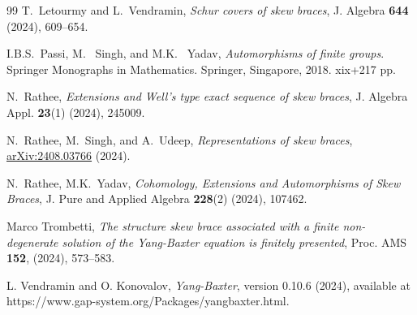 \documentclass[11pt]{amsart}
\theoremstyle{thrm}
\theoremstyle{plain}
\theoremstyle{definition}
\numberwithin{equation}{section}
\begin{document}
\begin{thebibliography}{99}
	 T.~Letourmy and L.~Vendramin, \textit{Schur covers of skew braces}, J. Algebra \textbf{644} (2024), 609--654.
	
	I.B.S.~Passi, M.~ Singh, and M.K.~ Yadav, \textit{Automorphisms of finite groups}. Springer Monographs in Mathematics. Springer, Singapore, 2018. xix+217 pp.
	
	 N.~Rathee, \textit{Extensions and Well's type exact sequence of skew braces}, J. Algebra Appl. \textbf{23}(1) (2024), 245009.
	
	 N.~Rathee, M.~Singh, and A.~Udeep, \textit{Representations of skew braces}, \href{http://arxiv.org/abs/2408.03766}{arXiv:2408.03766} (2024).
	
	 N.~Rathee, M.K.~Yadav, \textit{Cohomology, Extensions and Automorphisms of Skew Braces}, J. Pure and Applied Algebra \textbf{228}(2) (2024), 107462.
	
	
	
 Marco Trombetti, \textit{The structure skew brace associated with a finite non-degenerate solution of the Yang-Baxter equation is finitely presented}, Proc. AMS {\bf 152},  (2024), 573--583.
		
L. Vendramin and  O. Konovalov, {\it Yang-Baxter}, version 0.10.6  (2024), available at https://www.gap-system.org/Packages/yangbaxter.html.

	
\end{thebibliography}
\end{document}
